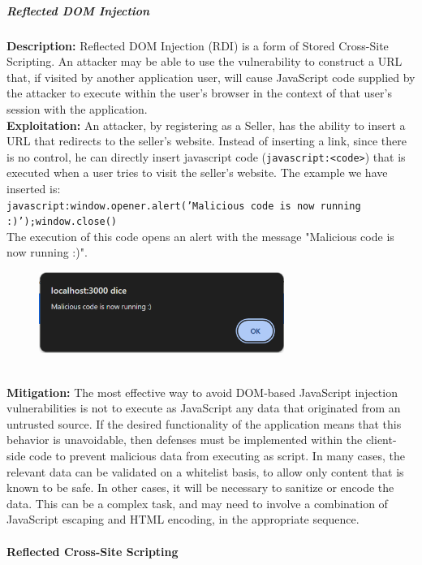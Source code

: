 \documentclass[]{article}
\begin{document}
\subparagraph{Reflected DOM Injection \\}
\textbf{Description:} Reflected DOM Injection (RDI) is a form of Stored Cross-Site Scripting. An attacker may be able to use the vulnerability to construct a URL that, if visited by another application user, will cause JavaScript code supplied by the attacker to execute within the user's browser in the context of that user's session with the application.
\\ \textbf{Exploitation:} An attacker, by registering as a Seller, has the ability to insert a URL that redirects to the seller's website. Instead of inserting a link, since there is no control, he can directly insert javascript code (\texttt{javascript:<code>}) that is executed when a user tries to visit the seller's website. The example we have inserted is: \\ 
\texttt{javascript:window.opener.alert('Malicious code is now running :)');window.close()} \\
The execution of this code opens an alert with the message "Malicious code is now running :)".
\begin{figure}[h]
\includegraphics[width=8cm]{images/ReflectedDOMInj.eps}
\centering
\end{figure}
\\ \textbf{Mitigation:}
The most effective way to avoid DOM-based JavaScript injection vulnerabilities is not to execute as JavaScript any data that originated from an untrusted source. If the desired functionality of the application means that this behavior is unavoidable, then defenses must be implemented within the client-side code to prevent malicious data from executing as script. In many cases, the relevant data can be validated on a whitelist basis, to allow only content that is known to be safe. In other cases, it will be necessary to sanitize or encode the data. This can be a complex task, and may need to involve a combination of JavaScript escaping and HTML encoding, in the appropriate sequence.

\paragraph{Reflected Cross-Site Scripting}
\end{document}
